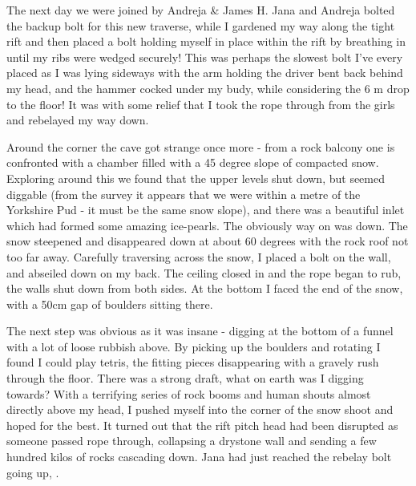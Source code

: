 The next day we were joined by Andreja \& James H. Jana and Andreja
bolted the backup bolt for this new traverse, while I gardened my way
along the tight rift and then placed a bolt holding myself in place
within the rift by breathing in until my ribs were wedged securely! This
was perhaps the slowest bolt I've every placed as I was lying sideways
with the arm holding the driver bent back behind my head, and the hammer
cocked under my budy, while considering the 6 m drop to the floor! It
was with some relief that I took the rope through from the girls and
rebelayed my way down.

Around the corner the cave got strange once more - from a rock balcony
one is confronted with a chamber filled with a 45 degree slope of
compacted snow. Exploring around this we found that the upper levels
shut down, but seemed diggable (from the survey it appears that we were
within a metre of the Yorkshire Pud - it must be the same snow slope),
and there was a beautiful inlet which had formed some amazing
ice-pearls. The obviously way on was down. The snow steepened and
disappeared down at about 60 degrees with the rock roof not too far
away. Carefully traversing across the snow, I placed a bolt on the wall,
and abseiled down on my back. The ceiling closed in and the rope began
to rub, the walls shut down from both sides. At the bottom I faced the
end of the snow, with a 50cm gap of boulders sitting there.


The next step was obvious as it was insane - digging at the bottom of a
funnel with a lot of loose rubbish above. By picking up the boulders and
rotating I found I could play tetris, the fitting pieces disappearing
with a gravely rush through the floor. There was a strong draft, what on
earth was I digging towards? With a terrifying series of rock booms and
human shouts almost directly above my head, I pushed myself into the
corner of the snow shoot and hoped for the best. It turned out that the
rift pitch head had been disrupted as someone passed rope through,
collapsing a drystone wall and sending a few hundred kilos of rocks
cascading down. Jana had just reached the rebelay bolt going up,
.

